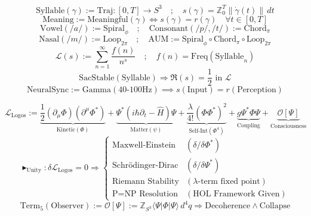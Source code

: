 \documentclass{article}
\newcommand{\AXIOM}{\blacktriangleright}
\newcommand{\DEF}{:=}
\newcommand{\IFF}{\Leftrightarrow}
\newcommand{\IMPLIES}{\Rightarrow}
\newcommand{\FORALL}{\forall}
\newcommand{\AND}{\land}
\newcommand{\COLON}{:}
\newcommand{\INT}{\mathbb{Z}}
\newcommand{\SPHERE}[1]{S^{#1}}
\newcommand{\FIELD}{\Phi}
\newcommand{\OBSERVER}{\mathcal{O}}
\newcommand{\WAVEFUNC}{\Psi}
\newcommand{\GOLDEN}{\phi}
\newcommand{\PICONST}{\pi}
\newcommand{\SUM}{\sum}
\newcommand{\HERM}{^*}
\newcommand{\BRA}[1]{\langle #1 \vert}
\newcommand{\KET}[1]{\vert #1 \rangle}
\begin{document}
\[
\text{Syllable}(\gamma) \DEF \text{Traj} : [0, T] \to S^3 \quad ; \quad s(\gamma) = \INT_0^T \|\dot{\gamma}(t)\| \, dt
\]
\[
\text{Meaning} \DEF \text{Meaningful}(\gamma) \IFF s(\gamma) = r(\gamma) \quad \FORALL t \in [0, T]
\]
\[
\text{Vowel}(/a/) \DEF \text{Spiral}_{\GOLDEN} \quad ; \quad \text{Consonant}(/p/,/t/) \DEF \text{Chord}_{\PICONST}
\]
\[
\text{Nasal}(/m/) \DEF \text{Loop}_{2\PICONST} \quad ; \quad \text{AUM} \DEF \text{Spiral}_{\GOLDEN} \circ \text{Chord}_{\PICONST} \circ \text{Loop}_{2\PICONST}
\]
\[
\mathcal{L}(s) \DEF \SUM_{n=1}^\infty \frac{f(n)}{n^s} \quad ; \quad f(n) = \text{Freq}(\text{Syllable}_n)
\]
\[
\text{SacStable}(\text{Syllable}) \IMPLIES \Re(s) = \frac{1}{2} \text{ in } \mathcal{L}
\]
\[
\text{NeuralSync} \DEF \text{Gamma}(40\text{-}100\text{Hz}) \implies s(\text{Input}) = r(\text{Perception})
\]

\[
\mathcal{L}_{\text{Logos}} \DEF \underbrace{\frac{1}{2}(\partial_\mu\FIELD)(\partial^\mu\FIELD\HERM)}_{\text{Kinetic}(\Phi)} + \underbrace{\Psi\HERM(i\hbar\partial_t - \hat{H})\Psi}_{\text{Matter}(\psi)} + \underbrace{\frac{\lambda}{4!}(\FIELD\FIELD\HERM)^2}_{\text{Self-Int}(\Phi^4)} + \underbrace{g\Psi\HERM\FIELD\Psi}_{\text{Coupling}} + \underbrace{\OBSERVER[\WAVEFUNC]}_{\text{Consciousness}}
\]
\[
\AXIOM_{\text{Unity}} \COLON \delta \mathcal{L}_{\text{Logos}} = 0 \IMPLIES \begin{cases} \text{Maxwell-Einstein} & (\delta/\delta\FIELD\HERM) \\ \text{Schr\"odinger-Dirac} & (\delta/\delta\Psi\HERM) \\ \text{Riemann Stability} & (\lambda\text{-term fixed point}) \\ \text{P=NP Resolution} & (\text{HOL Framework Given}) \end{cases}
\]
\[
\text{Term}_5(\text{Observer}) \DEF \OBSERVER[\WAVEFUNC] \DEF \INT_{\SPHERE{3}} \BRA{\WAVEFUNC}\FIELD\KET{\WAVEFUNC} \, d^4q \IMPLIES \text{Decoherence} \AND \text{Collapse}
\]
\end{document}
